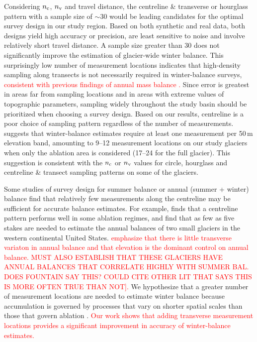 \documentclass[twocolumn,letterpaper]{igs}
\begin{document}
Considering $n_{\rm c}$, $n_{\rm v}$ and travel distance, the centreline \& transverse or hourglass pattern with a sample size of $\sim30$ would be leading candidates for the optimal survey design in our study region. Based on both synthetic and real data, both designs yield high accuracy or precision, are least sensitive to noise and involve relatively short travel distance. A sample size greater than 30 does not significantly improve the estimation of glacier-wide winter balance. This surprisingly low number of measurement locations indicates that high-density sampling along transects is not necessarily required in winter-balance surveys, \textcolor{red}{consistent with previous findings of annual mass balance \citep[e.g.][]{Cogley1999,Fountain1999}. }Since error is greatest in areas far from sampling locations and in areas with extreme values of topographic parameters, sampling widely throughout the study basin should be prioritized when choosing a survey design.  Based on our results, centreline is a poor choice of sampling pattern regardless of the number of measurements. \cite{Walmsley2015} suggests that winter-balance estimates require at least one measurement per 50\,m elevation band, amounting to 9--12 measurement locations on our study glaciers when only the ablation area is considered (17--24 for the full glacier). This suggestion is consistent with the $n_{\rm c}$ or $n_{\rm v}$ values for circle, hourglass and centreline \& transect sampling patterns on some of the glaciers.

Some studies of survey design for summer balance or annual (summer + winter) balance find that relatively few measurements along the centreline may be sufficient for accurate balance estimates. For example, \citep{Surjanovic2016} finds that a centreline pattern performs well in some ablation regimes, and \cite{Fountain1999} find that as few as five stakes are needed to estimate the annual balances of two small glaciers in the western continental United States.\textcolor{red}{ \cite{Fountain1999} emphasize that there is little transverse variaton in annual balance and that elevation is the dominant control on annual balance.} \textcolor{red}{MUST ALSO ESTABLISH THAT THESE GLACIERS HAVE ANNUAL BALANCES THAT CORRELATE HIGHLY WITH SUMMER BAL. DOES FOUNTAIN SAY THIS? COULD CITE OTHER LIT THAT SAYS THIS IS MORE OFTEN TRUE THAN NOT].} 
We hypothesize that a greater number of measurement locations are needed to estimate winter balance because accumulation is governed by processes that vary on shorter spatial scales than those that govern ablation \citep[e.g.][]{Dadic2010,Clark2011}. \textcolor{red}{Our work shows that adding transverse measurement locations provides a significant improvement in accuracy of winter-balance estimates.}
\end{document}

